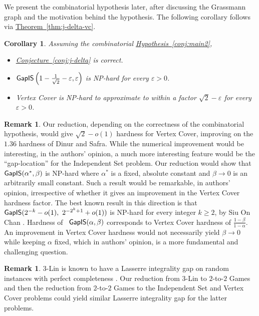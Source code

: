 \documentclass[11pt]{article}
\numberwithin{equation}{section}
\newtheorem{corollary}[theorem]{Corollary}
\theoremstyle{definition}
\newtheorem{remark}[theorem]{Remark}
\theoremstyle{plain}
\newcommand{\expref}[2]{\hyperref[#2]{#1~\ref{#2}}}
\newcommand\eps{\varepsilon}
\begin{document}
We present the combinatorial hypothesis later, after discussing the Grassmann graph and the motivation behind the hypothesis.
The following corollary follows via \expref{Theorem}{thm:j-delta-vc}.
\begin{corollary}\label{thm:main2} Assuming the combinatorial \expref{Hypothesis}{conj:main2},
\begin{itemize}
\item \expref{Conjecture}{conj:j-delta} is correct.
\item ${\sf GapIS}\left(1-\frac{1}{\sqrt{2}}-\eps, \eps\right)$ is NP-hard for every $\eps>0$.  %
%
\item Vertex Cover is NP-hard to approximate to within a factor $\sqrt{2}-\eps$ for every $\eps>0$.%
\end{itemize}
\end{corollary}



\begin{remark} Our reduction, depending on the correctness of the combinatorial hypothesis, would give $\sqrt{2} - o(1)$ hardness
for Vertex Cover, improving on the $1.36$ hardness of Dinur and Safra. While the numerical improvement would be interesting, in the
authors' opinion, a much more interesting feature would be the ``gap-location'' for the Independent Set problem. Our
reduction would show that ${\sf GapIS}(\alpha^*, \beta)$ is NP-hard where $\alpha^*$ is a fixed, absolute constant and $\beta \to 0$ is
an arbitrarily small constant. Such a result would be remarkable, in authors' opinion, irrespective of whether it gives an
improvement in the Vertex Cover hardness factor. The best known result in this direction is that ${\sf GapIS}(2^{-k}- o(1),
 ~2^{-2^k+1}+o(1))$ is NP-hard for every integer $k \geqslant 2$, by
Siu On Chan \cite{Chan13}. Hardness of ~${\sf GapIS}(\alpha, \beta)$ corresponds to Vertex Cover hardness of $\frac{1-\beta}{1-\alpha}$.
An improvement in Vertex Cover hardness would not necessarily yield $\beta \to 0$ while keeping $\alpha$ fixed, which in authors'
opinion, is a more fundamental and challenging question.
\end{remark}



\begin{remark}
$3$-Lin is known to have a %
Lasserre %
integrality gap %
on random instances  with perfect completeness \cite{Grigoriev, Schoen08, Tul09}.
Our reduction from $3$-Lin to $2$-to-$2$ Games and then the reduction from $2$-to-$2$ Games to the Independent Set and
Vertex Cover problems could yield similar Lasserre integrality gap for the latter problems.
%
%
%
\end{remark}
\end{document}
